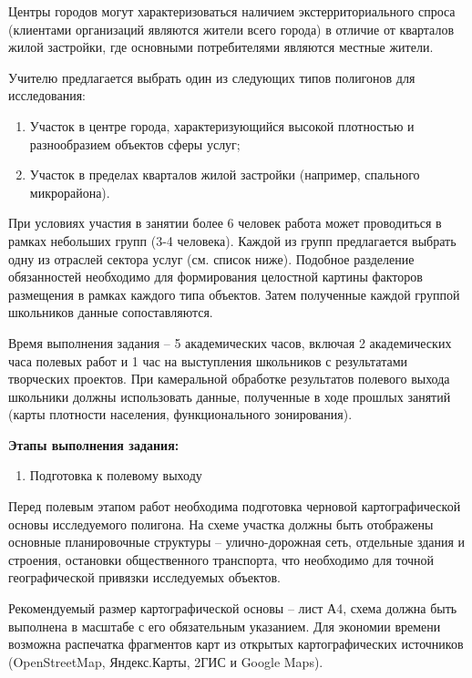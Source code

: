 \documentclass[
  11pt,
]{book}
\providecommand{\tightlist}{%
  \setlength{\itemsep}{0pt}\setlength{\parskip}{0pt}}
\begin{document}
Центры городов могут характеризоваться наличием экстерриториального спроса (клиентами организаций являются жители всего города) в отличие от кварталов жилой застройки, где основными потребителями являются местные жители.

Учителю предлагается выбрать один из следующих типов полигонов для исследования:

\begin{enumerate}
\def\labelenumi{\arabic{enumi})}
\tightlist
\item
  Участок в центре города, характеризующийся высокой плотностью и разнообразием объектов сферы услуг;
\item
  Участок в пределах кварталов жилой застройки (например, спального микрорайона).
\end{enumerate}

При условиях участия в занятии более 6 человек работа может проводиться в рамках небольших групп (3-4 человека). Каждой из групп предлагается выбрать одну из отраслей сектора услуг (см. список ниже). Подобное разделение обязанностей необходимо для формирования целостной картины факторов размещения в рамках каждого типа объектов. Затем полученные каждой группой школьников данные сопоставляются.

Время выполнения задания -- 5 академических часов, включая 2 академических часа полевых работ и 1 час на выступления школьников с результатами творческих проектов. При камеральной обработке результатов полевого выхода школьники должны использовать данные, полученные в ходе прошлых занятий (карты плотности населения, функционального зонирования).

\textbf{Этапы выполнения задания:}

\begin{enumerate}
\def\labelenumi{\arabic{enumi}.}
\tightlist
\item
  Подготовка к полевому выходу
\end{enumerate}

Перед полевым этапом работ необходима подготовка черновой картографической основы
исследуемого полигона. На схеме участка должны быть отображены основные
планировочные структуры -- улично-дорожная сеть, отдельные здания и строения,
остановки общественного транспорта, что необходимо для точной географической
привязки исследуемых объектов.

Рекомендуемый размер картографической основы -- лист А4, схема должна быть выполнена в
масштабе с его обязательным указанием. Для экономии времени возможна распечатка
фрагментов карт из открытых картографических источников (OpenStreetMap,
Яндекс.Карты, 2ГИС и Google Maps).
\end{document}
